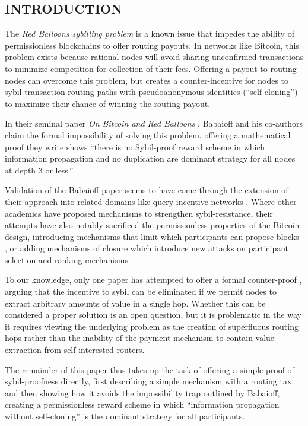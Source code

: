 \documentclass[oneside]{article}   	%
\begin{document}
\begin{multicols}{2}

\subsection*{INTRODUCTION}

The \textit{Red Balloons sybilling problem} is a known issue that impedes the ability of permissionless blockchains to offer routing payouts. In networks like Bitcoin, this problem exists because rational nodes will avoid sharing unconfirmed transactions to minimize competition for collection of their fees. Offering a payout to routing nodes can overcome this problem, but creates a counter-incentive for nodes to sybil transaction routing paths with pseudoanonymous identities (``self-cloning'') to maximize their chance of winning the routing payout.

In their seminal paper \textit{On Bitcoin and Red Balloons} \cite{Babaioff2011OnBA}, Babaioff and his co-authors claim the formal impossibility of solving this problem, offering a mathematical proof they write shows ``there is no Sybil-proof reward scheme in which information propagation and no duplication are dominant strategy for all nodes at depth 3 or less.''

Validation of the Babaioff paper seems to have come through the extension of their approach into related domains like query-incentive networks \cite{chen2013sybil} \cite{zhang2023collusionproof}. Where other academics have proposed mechanisms to strengthen sybil-resistance, their attempts have also notably sacrificed the permissionless properties of the Bitcoin design, introducing mechanisms that limit which participants can propose blocks \cite{DBLP:journals/corr/abs-1712-07564}, or adding mechanisms of closure which introduce new attacks on participant selection and ranking mechanisms \cite{DBLP:journals/corr/AbrahamMNRS16}.

To our knowledge, only one paper has attempted to offer a formal counter-proof \cite{DBLP:journals/corr/abs-2110-10606}, arguing that the incentive to sybil can be eliminated if we permit nodes to extract arbitrary amounts of value in a single hop. Whether this can be considered a proper solution is an open question, but it is problematic in the way it requires viewing the underlying problem as the creation of superfluous routing hops rather than the inability of the payment mechanism to contain value-extraction from self-interested routers.

The remainder of this paper thus takes up the task of offering a simple proof of sybil-proofness directly, first describing a simple mechanism with a routing tax, and then showing how it avoids the impossibility trap outlined by Babaioff, creating a permissionless reward scheme in which ``information propagation without self-cloning'' is the dominant strategy for all participants.


\end{multicols}
\end{document}
